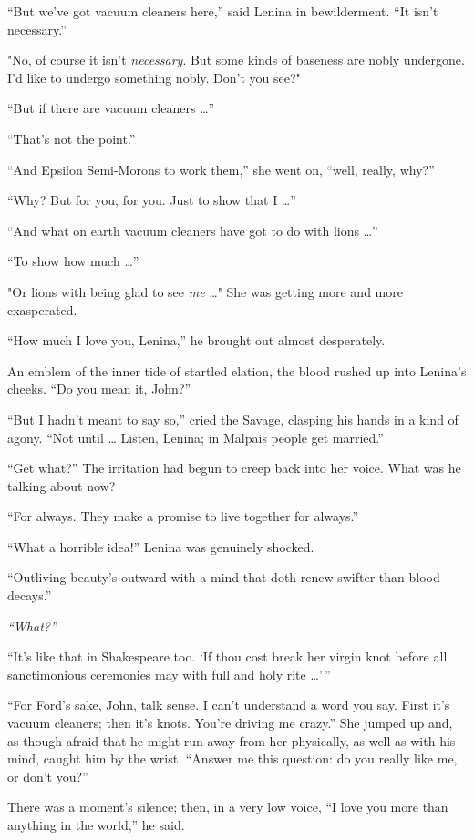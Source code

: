 \documentclass[12pt]{report}
\begin{document}
``But we've got vacuum cleaners here,'' said Lenina in bewilderment.
``It isn't necessary.''

"No, of course it isn't \emph{necessary}. But some kinds of baseness are
nobly undergone. I'd like to undergo something nobly. Don't you see?"

``But if there are vacuum cleaners \ldots{}''

``That's not the point.''

``And Epsilon Semi-Morons to work them,'' she went on, ``well, really,
why?''

``Why? But for you, for you. Just to show that I \ldots{}''

``And what on earth vacuum cleaners have got to do with lions \ldots{}''

``To show how much \ldots{}''

"Or lions with being glad to see \emph{me} \ldots{}" She was getting
more and more exasperated.

``How much I love you, Lenina,'' he brought out almost desperately.

An emblem of the inner tide of startled elation, the blood rushed up
into Lenina's cheeks. ``Do you mean it, John?''

``But I hadn't meant to say so,'' cried the Savage, clasping his hands
in a kind of agony. ``Not until \ldots{} Listen, Lenina; in Malpais
people get married.''

``Get what?'' The irritation had begun to creep back into her voice.
What was he talking about now?

``For always. They make a promise to live together for always.''

``What a horrible idea!'' Lenina was genuinely shocked.

``Outliving beauty's outward with a mind that doth renew swifter than
blood decays.''

\emph{``What?''}

``It's like that in Shakespeare too. `If thou cost break her virgin knot
before all sanctimonious ceremonies may with full and holy rite
\ldots{}'\,''

``For Ford's sake, John, talk sense. I can't understand a word you say.
First it's vacuum cleaners; then it's knots. You're driving me crazy.''
She jumped up and, as though afraid that he might run away from her
physically, as well as with his mind, caught him by the wrist. ``Answer
me this question: do you really like me, or don't you?''

There was a moment's silence; then, in a very low voice, ``I love you
more than anything in the world,'' he said.
\end{document}
